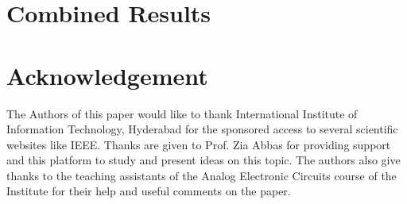 \documentclass[conference]{IEEEtran}
\begin{document}
\section{Combined Results}
\label{sec:result}


\section{Acknowledgement}
The Authors of this paper would like to thank International
Institute of Information Technology, Hyderabad for the sponsored access to several scientific websites like IEEE. Thanks
are given to Prof. Zia Abbas for providing support
and this platform to study and present ideas on this topic.
The authors also give thanks to the teaching assistants of the
Analog Electronic Circuits course of the Institute for their help
and useful comments on the paper.
\end{document}
